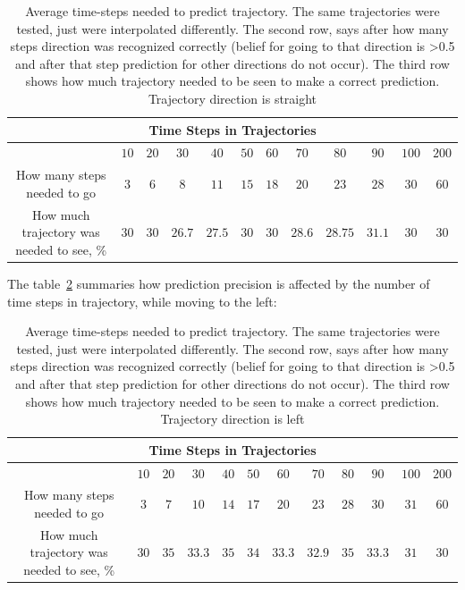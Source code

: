 \begin{table}[H]
	\centering
	\begin{tabular}{|c|c|c|c|c|c|c|c|c|c|c|c|} 
		\hline
		\multicolumn{12}{|c|}{Time Steps in Trajectories} \\
		\hline
		& $10$ & $20$ & $30$ & $40$ & $50$ & $60$ & $70$ & $80$ & $90$ & $100$ & $200$ \\ [0.5ex] 
		\hline\hline
		How many steps needed to go               & $3$  & $6$  & $8$    & $11$   & $15$ & $18$ & $20$   & $23$    & $28$   & $30$ & $60$ \\ [1ex]
		How much trajectory was needed to see, \% & $30$ & $30$ & $26.7$ & $27.5$ & $30$ & $30$ & $28.6$ & $28.75$ & $31.1$ & $30$ & $30$ \\ [1ex]
		\hline
	\end{tabular}
	\caption{Average time-steps needed to predict trajectory. The same trajectories were tested, just were interpolated differently. The second row, says after how many steps direction was recognized correctly (belief for going to that direction is >0.5 and after that step prediction for other directions do not occur). The third row shows how much trajectory needed to be seen to make a correct prediction. Trajectory direction is straight}
	\label{table:CompareStraight}
\end{table}

The table~\ref{table:CompareLeft} summaries how prediction precision is affected by the number of time steps in trajectory, while moving to the left:

\begin{table}[H]
	\centering
	\begin{tabular}{|c|c|c|c|c|c|c|c|c|c|c|c|} 
		\hline
		\multicolumn{12}{|c|}{Time Steps in Trajectories} \\
		\hline
		& $10$ & $20$ & $30$ & $40$ & $50$ & $60$ & $70$ & $80$ & $90$ & $100$ & $200$ \\ [0.5ex] 
		\hline\hline
		How many steps needed to go               & $3$  & $7$  & $10$    & $14$ & $17$ & $20$  &  $23$   & $28$ & $30$   & $31$ & $60$ \\ [1ex]
		How much trajectory was needed to see, \% & $30$ & $35$ & $33.3$ & $35$  & $34$ & $33.3$ & $32.9$ & $35$  & $33.3$ & $31$ & $30$ \\ [1ex]
		\hline
	\end{tabular}
	\caption{Average time-steps needed to predict trajectory. The same trajectories were tested, just were interpolated differently. The second row, says after how many steps direction was recognized correctly (belief for going to that direction is >0.5 and after that step prediction for other directions do not occur). The third row shows how much trajectory needed to be seen to make a correct prediction. Trajectory direction is left}
	\label{table:CompareLeft}
\end{table}

